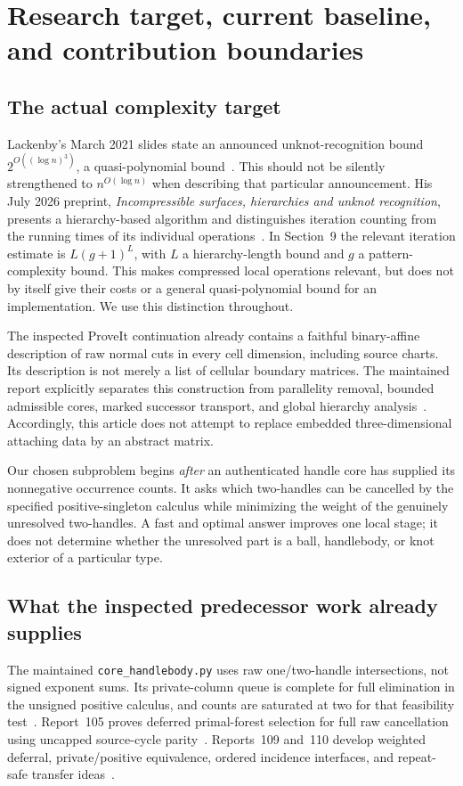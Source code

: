 \documentclass[11pt,letterpaper]{article}
\theoremstyle{definition}
\theoremstyle{remark}
\newcommand{\code}[1]{\texttt{\small #1}}
\begin{document}
\section{Research target, current baseline, and contribution boundaries}
\label{sec:scope}

\subsection{The actual complexity target}
Lackenby's March 2021 slides state an announced unknot-recognition bound $2^{O((\log n)^3)}$, a quasi-polynomial bound~\cite{lackenbytalk}. This should not be silently strengthened to $n^{O(\log n)}$ when describing that particular announcement. His July 2026 preprint, \emph{Incompressible surfaces, hierarchies and unknot recognition}, presents a hierarchy-based algorithm and distinguishes iteration counting from the running times of its individual operations~\cite{lackenby2026}. In Section~9 the relevant iteration estimate is $L(g+1)^L$, with $L$ a hierarchy-length bound and $g$ a pattern-complexity bound. This makes compressed local operations relevant, but does not by itself give their costs or a general quasi-polynomial bound for an implementation. We use this distinction throughout.

The inspected ProveIt continuation already contains a faithful binary-affine description of raw normal cuts in every cell dimension, including source charts. Its description is not merely a list of cellular boundary matrices. The maintained report explicitly separates this construction from parallelity removal, bounded admissible cores, marked successor transport, and global hierarchy analysis~\cite{provecut}. Accordingly, this article does not attempt to replace embedded three-dimensional attaching data by an abstract matrix.

Our chosen subproblem begins \emph{after} an authenticated handle core has supplied its nonnegative occurrence counts. It asks which two-handles can be cancelled by the specified positive-singleton calculus while minimizing the weight of the genuinely unresolved two-handles. A fast and optimal answer improves one local stage; it does not determine whether the unresolved part is a ball, handlebody, or knot exterior of a particular type.

\subsection{What the inspected predecessor work already supplies}
The maintained \code{core\_handlebody.py} uses raw one/two-handle intersections, not signed exponent sums. Its private-column queue is complete for full elimination in the unsigned positive calculus, and counts are saturated at two for that feasibility test~\cite{provecore}. Report~105 proves deferred primal-forest selection for full raw cancellation using uncapped source-cycle parity~\cite{prove105}. Reports~109 and~110 develop weighted deferral, private/positive equivalence, ordered incidence interfaces, and repeat-safe transfer ideas~\cite{prove109,prove110}.
\end{document}
